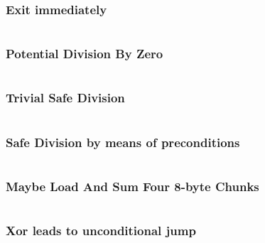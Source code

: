 \subsubsection{Exit immediately}
\label{prog:justexit}
\inputminted[linenos]{asm}{programs/justexit.asm}

\subsubsection{Potential Division By Zero}
\label{prog:bad_div}

\inputminted[linenos]{asm}{programs/bad_div.asm}


\subsubsection{Trivial Safe Division}
\label{prog:good_div}

\inputminted[linenos]{asm}{programs/good_div.asm}

\subsubsection{Safe Division by means of preconditions}
\label{prog:good_div_pre}

\inputminted[linenos]{asm}{programs/good_div_pre.asm}


\subsubsection{Maybe Load And Sum Four 8-byte Chunks}
\label{prog:load4times_safe}

\inputminted[linenos]{asm}{programs/load4times_safe.asm}


\subsubsection{Xor leads to unconditional jump}
\label{prog:xor_jump}

\inputminted[linenos]{asm}{programs/xor_jump.asm}





